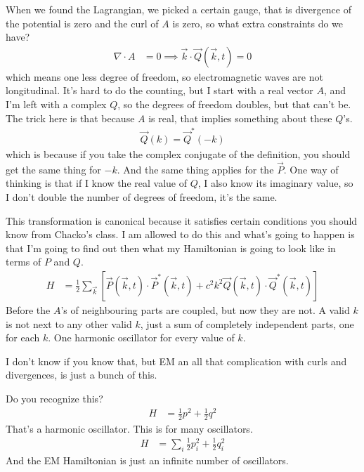 When we found the Lagrangian,
we picked a certain gauge,
that is divergence of the potential is zero and the curl of $A$ is zero,
so what extra constraints do we have?
\begin{align}
    \nabla\cdot A &= 0
    \implies
    \vec{k}\cdot\vec{Q}(\vec{k}, t) = 0
\end{align}
which means one less degree of freedom,
so electromagnetic waves are not longitudinal.
It's hard to do the counting,
but I start with a real vector $A$,
and I'm left with a complex $Q$,
so the degrees of freedom doubles,
but that can't be.
The trick here is that because $A$ is real,
that implies something about these $Q$'s.
\begin{align}
    \vec{Q}(k) = \vec{Q}^*(-k)
\end{align}
which is because if you take the complex conjugate of the definition,
you should get the same thing for $-k$.
And the same thing applies for the $\vec{P}$.
One way of thinking is that if I know the real value of $Q$,
I also know its imaginary value,
so I don't double the number of degrees of freedom,
it's the same.

This transformation is canonical because it satisfies certain conditions you
should know from Chacko's class.
I am allowed to do this and what's going to happen is that I'm going to find out
then what my Hamiltonian is going to look like in terms of $P$ and $Q$.
\begin{align}
    H &= \frac{1}{2} \sum_{\vec{k}}\left[ 
    \vec{P}(\vec{k}, t)\cdot\vec{P}^*(\vec{k}, t)
    + c^2 k^2 \vec{Q}(\vec{k}, t)\cdot \vec{Q}^*(\vec{k}, t)
    \right]
\end{align}
Before the $A$'s of neighbouring parts are coupled,
but now they are not.
A valid $k$ is not next to any other valid $k$,
just a sum of completely independent parts,
one for each $k$.
One harmonic oscillator for every value of $k$.

I don't know if you know that,
but EM an all that complication with curls and divergences,
is just a bunch of this.

Do you recognize this?
\begin{align}
    H &= \frac{1}{2}p^2 + \frac{1}{2}q^2
\end{align}
That's a harmonic oscillator.
This is for many oscillators.
\begin{align}
    H &= \sum_{i}\frac{1}{2}p_i^2 + \frac{1}{2}q_i^2
\end{align}
And the EM Hamiltonian is just an infinite number of oscillators.

